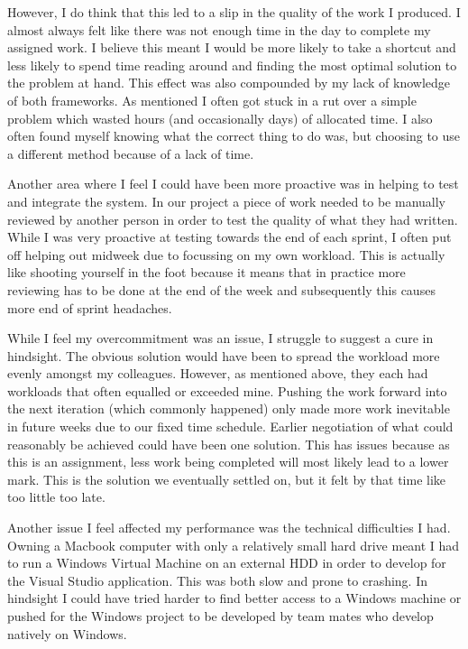 \documentclass[paper=a4, fontsize=11pt]{scrartcl}	%
\numberwithin{equation}{section}															%
\numberwithin{figure}{section}																%
\numberwithin{table}{section}
\begin{document}
However, I do think that this led to a slip in the quality of the work I produced. I almost always felt like there was not enough time in the day to complete my assigned work. I believe this meant I would be more likely to take a shortcut and less likely to spend time reading around and finding the most optimal solution to the problem at hand. This effect was also compounded by my lack of knowledge of both frameworks. As mentioned I often got stuck in a rut over a simple problem which wasted hours (and occasionally days) of allocated time. I also often found myself knowing what the correct thing to do was, but choosing to use a different method because of a lack of time.

Another area where I feel I could have been more proactive was in helping to test and integrate the system. In our project a piece of work needed to be manually reviewed by another person in order to test the quality of what they had written. While I was very proactive at testing towards the end of each sprint, I often put off helping out midweek due to focussing on my own workload. This is actually like shooting yourself in the foot because it means that in practice more reviewing has to be done at the end of the week and subsequently this causes more end of sprint headaches.  

While I feel my overcommitment was an issue, I struggle to suggest a cure in hindsight. The obvious solution would have been to spread the workload more evenly amongst my colleagues. However, as mentioned above, they each had workloads that often equalled or exceeded mine. Pushing the work forward into the next iteration (which commonly happened) only made more work inevitable in future weeks due to our fixed time schedule. Earlier negotiation of what could reasonably be achieved could have been one solution. This has issues because as this is an assignment, less work being completed will most likely lead to a lower mark. This is the solution we eventually settled on, but it felt by that time like too little too late.

Another issue I feel affected my performance was the technical difficulties I had. Owning a Macbook computer with only a relatively small hard drive meant I had to run a Windows Virtual Machine on an external HDD in order to develop for the Visual Studio application. This was both slow and prone to crashing. In hindsight I could have tried harder to find better access to a Windows machine or pushed for the Windows project to be developed by team mates who develop natively on Windows.
\end{document}
